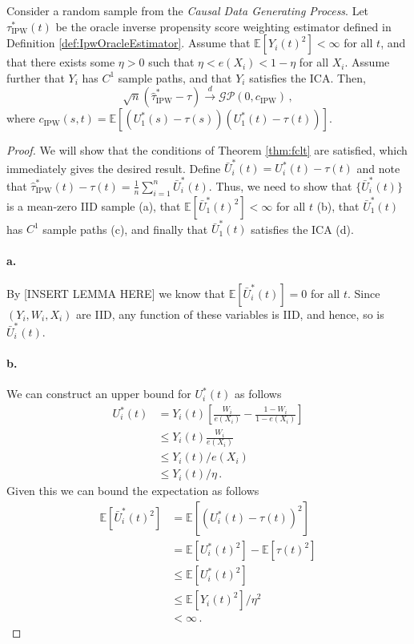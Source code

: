 \begin{theorem}\label{thm:IpwOracleCLT}
    Consider a random sample from the \emph{Causal Data Generating Process}. Let
    $\tau_{\text{IPW}}^\ast(t)$ be the oracle inverse propensity score weighting estimator defined
    in Definition \ref{def:IpwOracleEstimator}. Assume that $\mathbb{E}[Y_i(t)^2] < \infty$ for all
    $t$, and that there exists some $\eta > 0$ such that $\eta < e(X_i) < 1 - \eta$ for all $X_i$.
    Assume further that $Y_i$ has $C^1$ sample paths, and that $Y_i$ satisfies the ICA. Then,
    \[
        \sqrt{n} \left( \hat{\tau}_{\text{IPW}}^\ast - \tau \right)
        \overset{d}{\to} \mathcal{GP}\left(0, c_{\text{IPW}}\right) \,,
    \]
    where $c_{\text{IPW}}(s, t) = \mathbb{E}[(U_1^\ast(s) - \tau(s))(U_1^\ast(t) - \tau(t))]$.
\end{theorem}
\begin{proof}
    We will show that the conditions of Theorem \ref{thm:fclt} are satisfied, which immediately
    gives the desired result. Define $\bar{U}_i^\ast(t) = U_i^\ast(t) - \tau(t)$ and note that
    $\hat{\tau}_{\text{IPW}}^\ast(t) - \tau(t) = \frac{1}{n} \sum_{i=1}^n \bar{U}_i^\ast(t)$. Thus,
    we need to show that $\{\bar{U}_i^\ast(t)\}$ is a mean-zero IID sample (a), that
    $\mathbb{E}[\bar{U}_1^\ast(t)^2] < \infty$ for all $t$ (b), that $\bar{U}_1^\ast(t)$ has $C^1$
    sample paths (c), and finally that $\bar{U}_1^\ast(t)$ satisfies the ICA (d).

    \paragraph{a.}
    By [INSERT LEMMA HERE] we know that $\mathbb{E}[\bar{U}_i^\ast(t)] = 0$ for all $t$. Since
    $(Y_i, W_i, X_i)$ are IID, any function of these variables is IID, and hence, so is
    $\bar{U}_i^\ast(t)$.

    \paragraph{b.}
    We can construct an upper bound for $U_i^\ast(t)$ as follows
    \begin{align}
        U_i^\ast(t)
        &= Y_i(t) \left[ \frac{W_i}{e(X_i)} - \frac{1 - W_i}{1 - e(X_i)} \right] \\
        &\leq Y_i(t) \frac{W_i}{e(X_i)} \\
        &\leq Y_i(t) / e(X_i) \\
        &\leq Y_i(t) / \eta \,.
    \end{align}
    Given this we can bound the expectation as follows
    \begin{align}
        \mathbb{E}[\bar{U}_i^\ast(t)^2]
        &= \mathbb{E}[(U_i^\ast(t) - \tau(t))^2] \\
        &= \mathbb{E}[U_i^\ast(t)^2] - \mathbb{E}[\tau(t)^2] \\
        &\leq \mathbb{E}[U_i^\ast(t)^2] \\
        &\leq \mathbb{E}[Y_i(t)^2] / \eta^2 \\
        &< \infty \,.
    \end{align}


\end{proof}
